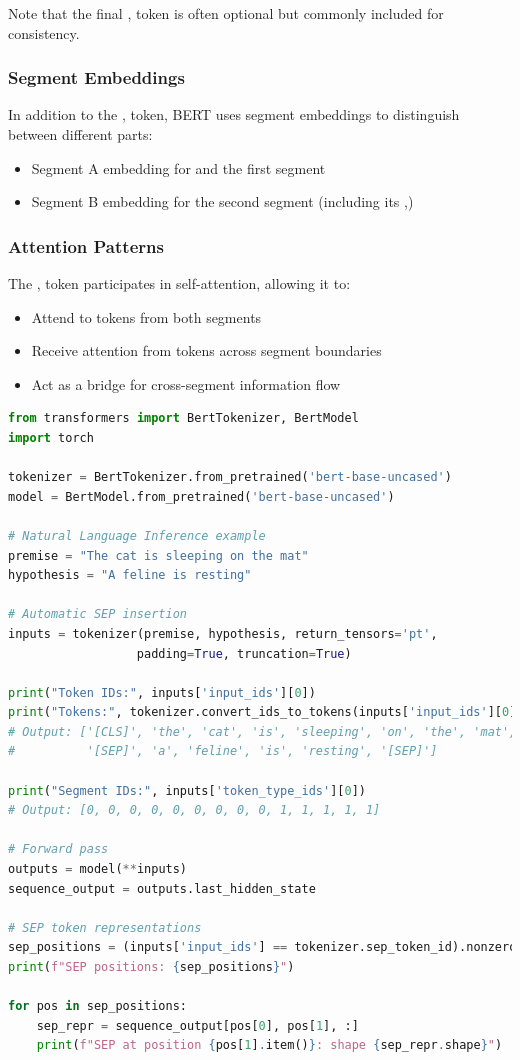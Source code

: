 Note that the final \sep{} token is often optional but commonly included for consistency.

\subsubsection{Segment Embeddings}
In addition to the \sep{} token, BERT uses segment embeddings to distinguish between different parts:
\begin{itemize}
\item Segment A embedding for \cls{} and the first segment
\item Segment B embedding for the second segment (including its \sep{})
\end{itemize}

\subsubsection{Attention Patterns}
The \sep{} token participates in self-attention, allowing it to:
\begin{itemize}
\item Attend to tokens from both segments
\item Receive attention from tokens across segment boundaries
\item Act as a bridge for cross-segment information flow
\end{itemize}

\begin{lstlisting}[language=Python, caption=SEP Token Usage]
from transformers import BertTokenizer, BertModel
import torch

tokenizer = BertTokenizer.from_pretrained('bert-base-uncased')
model = BertModel.from_pretrained('bert-base-uncased')

# Natural Language Inference example
premise = "The cat is sleeping on the mat"
hypothesis = "A feline is resting"

# Automatic SEP insertion
inputs = tokenizer(premise, hypothesis, return_tensors='pt', 
                  padding=True, truncation=True)

print("Token IDs:", inputs['input_ids'][0])
print("Tokens:", tokenizer.convert_ids_to_tokens(inputs['input_ids'][0]))
# Output: ['[CLS]', 'the', 'cat', 'is', 'sleeping', 'on', 'the', 'mat', 
#          '[SEP]', 'a', 'feline', 'is', 'resting', '[SEP]']

print("Segment IDs:", inputs['token_type_ids'][0])
# Output: [0, 0, 0, 0, 0, 0, 0, 0, 0, 1, 1, 1, 1, 1]

# Forward pass
outputs = model(**inputs)
sequence_output = outputs.last_hidden_state

# SEP token representations
sep_positions = (inputs['input_ids'] == tokenizer.sep_token_id).nonzero()
print(f"SEP positions: {sep_positions}")

for pos in sep_positions:
    sep_repr = sequence_output[pos[0], pos[1], :]
    print(f"SEP at position {pos[1].item()}: shape {sep_repr.shape}")
\end{lstlisting}

